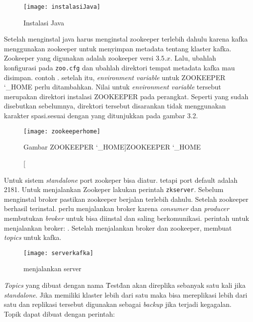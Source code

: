 \begin{figure}[H] 
	\centering  
	\texttt{[image: instalasiJava]}  
	\caption[Gambar Instalasi Java]{Instalasi Java} 
	\label{fig:Java-instalation} 
\end{figure}

Setelah menginstal java harus menginstal zookeeper terlebih dahulu karena kafka menggunakan zookeeper untuk menyimpan metadata tentang klaster kafka. Zookeeper yang digunakan adalah zookeeper versi $3.5.x$. Lalu, ubahlah konfigurasi pada \texttt{zoo.cfg} dan ubahlah direktori tempat metadata kafka mau disimpan. contoh . setelah itu, \textit{environment variable} untuk ZOOKEEPER \char`_HOME perlu ditambahkan. Nilai untuk \textit{environment variable} tersebut merupakan direktori instalasi ZOOKEEPER pada perangkat. Seperti yang sudah disebutkan sebelumnya, direktori tersebut disarankan tidak menggunakan karakter spasi.sesuai dengan yang ditunjukkan pada gambar 3.2. 

\begin{figure}[H] 
	\centering  
	\texttt{[image: zookeeperhome]}  
	\caption[Gambar ZOOKEEPER \char`_HOME]{ZOOKEEPER \char`_HOME} 
	\label{fig:zookeeper-instalation} 
\end{figure}

Untuk sistem \textit{standalone} port zookeper bisa diatur. tetapi port default adalah 2181. Untuk
menjalankan Zookeper lakukan perintah \texttt{zkserver}. Sebelum menginstal broker pastikan zookeeper berjalan terlebih dahulu. Setelah zookeeper berhasil terinstal. perlu menjalankan broker karena \textit{consumer} dan \textit{producer} membutukan \textit{broker} untuk bisa diinstal dan saling berkomunikasi. perintah untuk menjalankan broker: . Setelah menjalankan broker dan zookeeper, membuat \textit{topics} untuk kafka.

\begin{figure}[H] 
	\centering  
	\texttt{[image: serverkafka]}  
	\caption[Gambar menjalankan server]{menjalankan server} 
	\label{fig:topic-run} 
\end{figure}

\textit{Topics} yang dibuat dengan nama \"Test\" dan akan direplika sebanyak satu kali jika \textit{standalone}. Jika memiliki klaster lebih dari satu maka bisa mereplikasi lebih dari satu dan replikasi tersebut digunakan sebagai \textit{backup} jika terjadi kegagalan. Topik dapat dibuat dengan perintah: 

